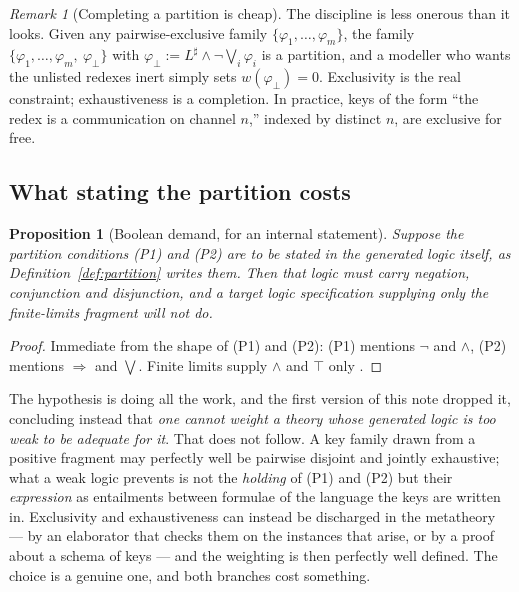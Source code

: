 \documentclass[11pt,a4paper]{article}
\theoremstyle{plain}
\newtheorem{proposition}[theorem]{Proposition}
\theoremstyle{definition}
\theoremstyle{remark}
\newtheorem{remark}[theorem]{Remark}
\newcommand{\wmap}{w}
\begin{document}
\begin{remark}[Completing a partition is cheap]
\label{rem:default}
The discipline is less onerous than it looks. Given any pairwise-exclusive family
$\{\varphi_1,\dots,\varphi_m\}$, the family
$\{\varphi_1,\dots,\varphi_m,\ \varphi_\bot\}$ with
$\varphi_\bot := L^\sharp \wedge \neg\bigvee_i \varphi_i$ is a partition, and a modeller who wants
the unlisted redexes inert simply sets $\wmap(\varphi_\bot) = 0$. Exclusivity is the real
constraint; exhaustiveness is a completion. In practice, keys of the form ``the redex is a
communication on channel $n$,'' indexed by distinct $n$, are exclusive for free.
\end{remark}

\subsection{What stating the partition costs}
\label{sec:boolean}

\begin{proposition}[Boolean demand, for an internal statement]
\label{prop:boolean}
Suppose the partition conditions (P1) and (P2) are to be stated \emph{in the generated logic itself},
as Definition~\ref{def:partition} writes them. Then that logic must carry negation, conjunction and
disjunction, and a target logic specification supplying only the finite-limits fragment will not do.
\end{proposition}

\begin{proof}
Immediate from the shape of (P1) and (P2): (P1) mentions $\neg$ and $\wedge$, (P2) mentions
$\Rightarrow$ and $\bigvee$. Finite limits supply $\wedge$ and $\top$ only \cite{omnibus}.
\end{proof}

The hypothesis is doing all the work, and the first version of this note dropped it, concluding
instead that \emph{one cannot weight a theory whose generated logic is too weak to be adequate for
it}. That does not follow. A key family drawn from a positive fragment may perfectly well be
pairwise disjoint and jointly exhaustive; what a weak logic prevents is not the \emph{holding} of
(P1) and (P2) but their \emph{expression} as entailments between formulae of the language the keys
are written in. Exclusivity and exhaustiveness can instead be discharged in the metatheory --- by an
elaborator that checks them on the instances that arise, or by a proof about a schema of keys --- and
the weighting is then perfectly well defined. The choice is a genuine one, and both branches cost
something.
\end{document}
